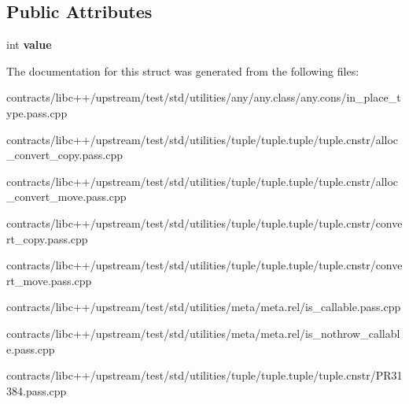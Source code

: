 \subsection*{Public Attributes}
\begin{DoxyCompactItemize}
\item 
\mbox{\label{struct_implicit_ab82572d057cad037d14919d149d198a7}} 
int {\bfseries value}
\end{DoxyCompactItemize}


The documentation for this struct was generated from the following files\+:\begin{DoxyCompactItemize}
\item 
contracts/libc++/upstream/test/std/utilities/any/any.\+class/any.\+cons/in\+\_\+place\+\_\+type.\+pass.\+cpp\item 
contracts/libc++/upstream/test/std/utilities/tuple/tuple.\+tuple/tuple.\+cnstr/alloc\+\_\+convert\+\_\+copy.\+pass.\+cpp\item 
contracts/libc++/upstream/test/std/utilities/tuple/tuple.\+tuple/tuple.\+cnstr/alloc\+\_\+convert\+\_\+move.\+pass.\+cpp\item 
contracts/libc++/upstream/test/std/utilities/tuple/tuple.\+tuple/tuple.\+cnstr/convert\+\_\+copy.\+pass.\+cpp\item 
contracts/libc++/upstream/test/std/utilities/tuple/tuple.\+tuple/tuple.\+cnstr/convert\+\_\+move.\+pass.\+cpp\item 
contracts/libc++/upstream/test/std/utilities/meta/meta.\+rel/is\+\_\+callable.\+pass.\+cpp\item 
contracts/libc++/upstream/test/std/utilities/meta/meta.\+rel/is\+\_\+nothrow\+\_\+callable.\+pass.\+cpp\item 
contracts/libc++/upstream/test/std/utilities/tuple/tuple.\+tuple/tuple.\+cnstr/P\+R31384.\+pass.\+cpp\end{DoxyCompactItemize}
